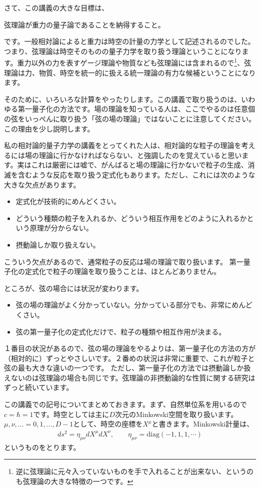 \documentclass[report,paper=a4, fontsize=12pt, line_length=16cm, number_of_lines=33,dvipdfmx]{jlreq}
\newenvironment{important}{\begin{tcolorbox}[
  colback = white,
  colframe = red!35,
  boxrule = 2mm,
  fonttitle = \bfseries,
  after = \noindent] }{\end{tcolorbox}}
\numberwithin{equation}{chapter}
\numberwithin{equation}{section}
\begin{document}
さて、この講義の大きな目標は、
\begin{important}
  弦理論が重力の量子論であることを納得すること。
\end{important}
です。一般相対論によると重力は時空の計量の力学として記述されるのでした。つまり、弦理論は時空そのものの量子力学を取り扱う理論ということになります。重力以外の力を表すゲージ理論や物質なども弦理論には含まれるので\footnote{逆に弦理論に元々入っていないものを手で入れることが出来ない、というのも弦理論の大きな特徴の一つです。}、弦理論は力、物質、時空を統一的に扱える統一理論の有力な候補ということになります。

そのために、いろいろな計算をやったりします。この講義で取り扱うのは、いわゆる第一量子化の方法です。場の理論を知っている人は、ここでやるのは任意個の弦をいっぺんに取り扱う「弦の場の理論」ではないことに注意してください。この理由を少し説明します。

私の相対論的量子力学の講義をとってくれた人は、相対論的な粒子の理論を考えるには場の理論に行かなければならない、と強調したのを覚えていると思います。実はこれは厳密には嘘で、がんばると場の理論に行かないで粒子の生成、消滅を含むような反応を取り扱う定式化もあります。ただし、これには次のような大きな欠点があります。
\begin{itemize}
  \item 定式化が技術的にめんどくさい。
  \item どういう種類の粒子を入れるか、どういう相互作用をどのように入れるかという原理が分からない。
  \item 摂動論しか取り扱えない。
\end{itemize}
こういう欠点があるので、通常粒子の反応は場の理論で取り扱います。
第一量子化の定式化で粒子の理論を取り扱うことは、ほとんどありません。

ところが、弦の場合には状況が変わります。
\begin{itemize}
  \item 弦の場の理論がよく分かっていない。分かっている部分でも、非常にめんどくさい。
  \item 弦の第一量子化の定式化だけで、粒子の種類や相互作用が決まる。
\end{itemize}
１番目の状況があるので、弦の場の理論をやるよりは、第一量子化の方法の方が（相対的に）ずっとやさしいです。２番めの状況は非常に重要で、これが粒子と弦の最も大きな違いの一つです。
ただし、第一量子化の方法では摂動論しか扱えないのは弦理論の場合も同じです。弦理論の非摂動論的な性質に関する研究はずっと続いています。

この講義での記号についてまとめておきます。まず、自然単位系を用いるので$c=\hbar=1$です。時空としては主に$D$次元のMinkowski空間を取り扱います。$\mu,\nu,\dots=0,1,\dots,D-1$として、時空の座標を$X^{\mu}$と書きます。Minkowski計量は、
\begin{align}
  ds^2=\eta_{\mu\nu}dX^{\mu}dX^{\nu},\qquad
  \eta_{\mu\nu}=\mathrm{diag}(-1,1,1,\cdots)
\end{align}
というものをとります。
\end{document}
